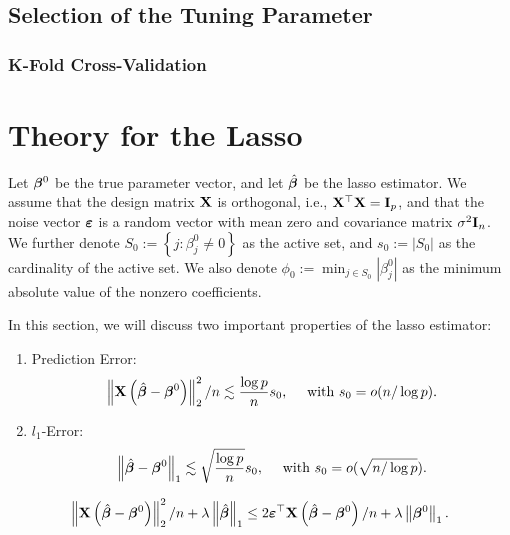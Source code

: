 \subsection{Selection of the Tuning Parameter}

\subsubsection{K-Fold Cross-Validation}

\section{Theory for the Lasso}

Let $\boldsymbol{\beta}^{0}$ be the true parameter vector, and let $\hat{\boldsymbol{\beta}}$ be the lasso estimator. We assume that the design matrix ${\bf X}$ is orthogonal, i.e., ${\bf X}^{\top}{\bf X}={\bf I}_{p}$, and that the noise vector $\boldsymbol{\varepsilon}$ is a random vector with mean zero and covariance matrix $\sigma^{2}{\bf I}_{n}$.
We further denote $S_{0}:=\left\{j:\beta_{j}^{0}\neq 0\right\}$ as the active set, and $s_{0}:=\left|S_{0}\right|$ as the cardinality of the active set. We also denote $\phi_{0}:=\min_{j\in S_{0}}\left|\beta_{j}^{0}\right|$ as the minimum absolute value of the nonzero coefficients.

In this section, we will discuss two important properties of the lasso estimator:
\begin{enumerate}
	\item Prediction Error:
	      \begin{equation*}
		      \left\|{\bf X}\left(\hat{\boldsymbol{\beta}}-\boldsymbol{\beta}^{0}\right)\right\|_{2}^{2}/n\lesssim \frac{\log p}{n}s_{0}, \quad\text{ with }s_{0}=o(n/\log p).
	      \end{equation*}
	\item $l_{1}$-Error:
	      \begin{equation*}
		      \left\|\hat{\boldsymbol{\beta}}-\boldsymbol{\beta}^{0}\right\|_{1}\lesssim\sqrt{\frac{\log p}{n}}s_{0}, \quad\text{ with }s_{0}=o(\sqrt{n/\log p}).
	      \end{equation*}
\end{enumerate}

\begin{lemma}
	\label{lem:basic-inequality}
	\begin{equation*}
		\left\|{\bf X}\left(\hat{\boldsymbol{\beta}}-\boldsymbol{\beta}^{0}\right)\right\|_{2}^{2}/n+\lambda\left\|\hat{\boldsymbol{\beta}}\right\|_{1}\leq 2\boldsymbol{\varepsilon}^{\top}{\bf X}\left(\hat{\boldsymbol{\beta}}-\boldsymbol{\beta}^{0}\right)/n+\lambda\left\|\boldsymbol{\beta}^{0}\right\|_{1}.
	\end{equation*}
\end{lemma}

